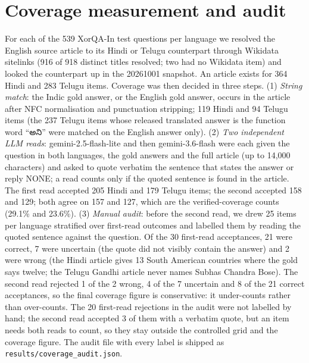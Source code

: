 \section{Coverage measurement and audit}
\label{app:coverage}
For each of the 539 XorQA-In test questions per language we resolved the English source article to its Hindi or Telugu counterpart through Wikidata sitelinks (916 of 918 distinct titles resolved; two had no Wikidata item) and looked the counterpart up in the 20261001 snapshot. An article exists for 364 Hindi and 283 Telugu items. Coverage was then decided in three steps. (1) \emph{String match}: the Indic gold answer, or the English gold answer, occurs in the article after NFC normalisation and punctuation stripping; 119 Hindi and 94 Telugu items (the 237 Telugu items whose released translated answer is the function word ``{\telu అని}'' were matched on the English answer only). (2) \emph{Two independent LLM reads}: gemini-2.5-flash-lite and then gemini-3.6-flash were each given the question in both languages, the gold answers and the full article (up to 14,000 characters) and asked to quote verbatim the sentence that states the answer or reply NONE; a read counts only if the quoted sentence is found in the article. The first read accepted 205 Hindi and 179 Telugu items; the second accepted 158 and 129; both agree on 157 and 127, which are the verified-coverage counts (29.1\% and 23.6\%). (3) \emph{Manual audit}: before the second read, we drew 25 items per language stratified over first-read outcomes and labelled them by reading the quoted sentence against the question. Of the 30 first-read acceptances, 21 were correct, 7 were uncertain (the quote did not visibly contain the answer) and 2 were wrong (the Hindi article gives 13 South American countries where the gold says twelve; the Telugu Gandhi article never names Subhas Chandra Bose). The second read rejected 1 of the 2 wrong, 4 of the 7 uncertain and 8 of the 21 correct acceptances, so the final coverage figure is conservative: it under-counts rather than over-counts. The 20 first-read rejections in the audit were not labelled by hand; the second read accepted 3 of them with a verbatim quote, but an item needs both reads to count, so they stay outside the controlled grid and the coverage figure. The audit file with every label is shipped as \texttt{results/coverage\_audit.json}.
